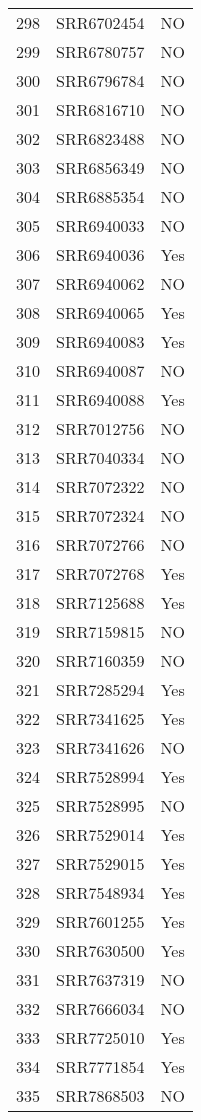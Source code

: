 \begin{longtable}{ccc}
  298 & SRR6702454 & NO \\ 
  299 & SRR6780757 & NO \\ 
  300 & SRR6796784 & NO \\ 
  301 & SRR6816710 & NO \\ 
  302 & SRR6823488 & NO \\ 
  303 & SRR6856349 & NO \\ 
  304 & SRR6885354 & NO \\ 
  305 & SRR6940033 & NO \\ 
  306 & SRR6940036 & Yes \\ 
  307 & SRR6940062 & NO \\ 
  308 & SRR6940065 & Yes \\ 
  309 & SRR6940083 & Yes \\ 
  310 & SRR6940087 & NO \\ 
  311 & SRR6940088 & Yes \\ 
  312 & SRR7012756 & NO \\ 
  313 & SRR7040334 & NO \\ 
  314 & SRR7072322 & NO \\ 
  315 & SRR7072324 & NO \\ 
  316 & SRR7072766 & NO \\ 
  317 & SRR7072768 & Yes \\ 
  318 & SRR7125688 & Yes \\ 
  319 & SRR7159815 & NO \\ 
  320 & SRR7160359 & NO \\ 
  321 & SRR7285294 & Yes \\ 
  322 & SRR7341625 & Yes \\ 
  323 & SRR7341626 & NO \\ 
  324 & SRR7528994 & Yes \\ 
  325 & SRR7528995 & NO \\ 
  326 & SRR7529014 & Yes \\ 
  327 & SRR7529015 & Yes \\ 
  328 & SRR7548934 & Yes \\ 
  329 & SRR7601255 & Yes \\ 
  330 & SRR7630500 & Yes \\ 
  331 & SRR7637319 & NO \\ 
  332 & SRR7666034 & NO \\ 
  333 & SRR7725010 & Yes \\ 
  334 & SRR7771854 & Yes \\ 
  335 & SRR7868503 & NO \\ 

\end{longtable}
